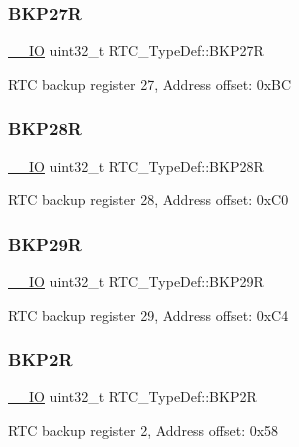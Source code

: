 \subsubsection{\texorpdfstring{BKP27R}{BKP27R}}
{\footnotesize\ttfamily \mbox{\hyperlink{core__sc300_8h_aec43007d9998a0a0e01faede4133d6be}{\+\_\+\+\_\+\+IO}} uint32\+\_\+t R\+T\+C\+\_\+\+Type\+Def\+::\+B\+K\+P27R}

R\+TC backup register 27, Address offset\+: 0x\+BC \mbox{\label{struct_r_t_c___type_def_abd26829bfe028b5882d523e7035eb497}} 
\subsubsection{\texorpdfstring{BKP28R}{BKP28R}}
{\footnotesize\ttfamily \mbox{\hyperlink{core__sc300_8h_aec43007d9998a0a0e01faede4133d6be}{\+\_\+\+\_\+\+IO}} uint32\+\_\+t R\+T\+C\+\_\+\+Type\+Def\+::\+B\+K\+P28R}

R\+TC backup register 28, Address offset\+: 0x\+C0 \mbox{\label{struct_r_t_c___type_def_aa240211cf23c5822f4ac9c690a7a248c}} 
\subsubsection{\texorpdfstring{BKP29R}{BKP29R}}
{\footnotesize\ttfamily \mbox{\hyperlink{core__sc300_8h_aec43007d9998a0a0e01faede4133d6be}{\+\_\+\+\_\+\+IO}} uint32\+\_\+t R\+T\+C\+\_\+\+Type\+Def\+::\+B\+K\+P29R}

R\+TC backup register 29, Address offset\+: 0x\+C4 \mbox{\label{struct_r_t_c___type_def_aa845c401b24d2ef1049f489f26d35626}} 
\subsubsection{\texorpdfstring{BKP2R}{BKP2R}}
{\footnotesize\ttfamily \mbox{\hyperlink{core__sc300_8h_aec43007d9998a0a0e01faede4133d6be}{\+\_\+\+\_\+\+IO}} uint32\+\_\+t R\+T\+C\+\_\+\+Type\+Def\+::\+B\+K\+P2R}

R\+TC backup register 2, Address offset\+: 0x58 \mbox{\label{struct_r_t_c___type_def_a32b51e2f18c68ea5af816d1f231b7ec6}} 
